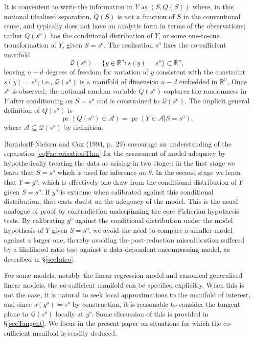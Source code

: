 \documentclass[10pt, reqno]{amsart}
\numberwithin{equation}{section}
\newcommand{\cosuff}{\mathcal{Q}}
\newcommand{\pr}{\mathop{\mathrm{pr}}}
\newcommand{\RR}{\mathbb{R}}
\begin{document}
It is convenient to write the information in $Y$ as $(S,Q(S))$ where, in this notional idealised separation, $Q(S)$ is not a function of $S$ in the conventional sense, and typically does not have an analytic form in terms of the observations; rather $Q(s^o)$ has the conditional distribution of $Y$, or some one-to-one transformation of $Y$, given $S=s^o$. The realisation $s^o$ fixes the co-sufficient manifold 
%
\begin{equation}\label{eqCoSuffMan}
	\cosuff(s^o)=\{y\in\RR^n: s(y)=s^o\}\subset \RR^n,
\end{equation}
%
leaving $n-d$ degrees of freedom for variation of $y$ consistent with the constraint $s(y)=s^o$, i.e., $\cosuff(s^o)$ is a manifold of dimension $n-d$ embedded in $\RR^n$. Once $s^o$ is observed, the notional random variable $Q(s^o)$ captures the randomness in $Y$ after conditioning on $S=s^o$ and is constrained to $\cosuff(s^o)$. The implicit general definition of $Q(s^o)$ is
%
\begin{equation}\label{eqCosuffStat}
	\pr(Q(s^o)\in \mathcal{A})=\pr(Y\in \mathcal{A}|S=s^o),
\end{equation}
where $\mathcal{A}\subseteq \cosuff(s^o)$ by definition.


Barndorff-Nielsen and Cox (1994, p.~29) encourage an understanding of the separation \eqref{eqFactorisationThm} for the assessment of model adequacy by hypothetically treating the data as arising in two stages: in the first stage we learn that $S=s^o$ which is used for inference on $\theta$. In the second stage we learn that $Y=y^o$, which is effectively one draw from the conditional distribution of $Y$ given $S=s^o$. If $y^o$ is extreme when calibrated against this conditional distribution, that casts doubt on the adequacy of the model. This is the usual analogue of proof by contradiction underpinning the core Fisherian hypothesis tests. By calibrating $y^o$ against the conditional distribution under the model hypothesis of $Y$ given $S=s^o$, we avoid the need to compare a smaller model against a larger one, thereby avoiding the post-reduction miscalibration suffered by a likelihood ratio test against a data-dependent encompassing model, as described in \S \ref{secIntro}.

For some models, notably the linear regression model and canonical generalised linear models, the co-sufficient manifold can be specified explicitly. When this is not the case, it is natural to seek local approximations to the manifold of interest, and since $s(y^o)=s^o$ by construction, it is reasonable to consider the tangent plane to $\cosuff(s^o)$ locally at $y^o$. Some discussion of this is provided in \S \ref{secTangent}. We focus in the present paper on situations for which the co-sufficient manifold is readily deduced.
\end{document}
